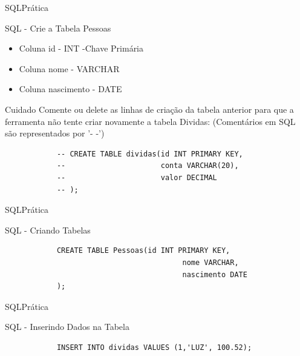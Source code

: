\documentclass{beamer}
\begin{document}
\begin{frame}[fragile]{SQL}{Prática}
	\begin{block} {SQL - Crie a Tabela Pessoas}
		\begin{itemize}
			\item Coluna id - INT -Chave Primária
			\item Coluna nome - VARCHAR
			\item Coluna nascimento - DATE
		\end{itemize}
	\end{block}
	\begin{block}{Cuidado}
		Comente ou delete as linhas de criação da tabela anterior para que a ferramenta não tente criar novamente a tabela Dividas: (Comentários em SQL são representados por '- -')
		\begin{verbatim}
		    -- CREATE TABLE dividas(id INT PRIMARY KEY, 
		    --                      conta VARCHAR(20),
		    --                      valor DECIMAL
		    -- );
		\end{verbatim}
	\end{block}
\end{frame}

\begin{frame}[fragile]{SQL}{Prática}
	\begin{block} {SQL - Criando Tabelas}
		\begin{verbatim}
		    CREATE TABLE Pessoas(id INT PRIMARY KEY, 
		    		                     nome VARCHAR, 
		    		                     nascimento DATE
		    );
		\end{verbatim}
	\end{block}
\end{frame}

\begin{frame}[fragile]{SQL}{Prática}
	\begin{block} {SQL - Inserindo Dados na Tabela}
		\begin{verbatim}
		    INSERT INTO dividas VALUES (1,'LUZ', 100.52);
		\end{verbatim}
	\end{block}
\end{frame}


%			
\end{document}
